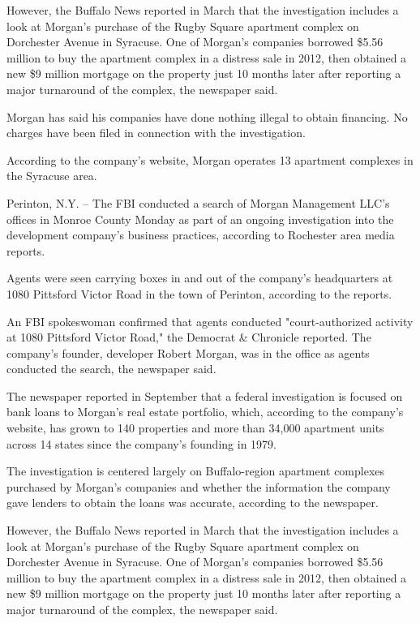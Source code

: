 \documentclass[../../main/main.tex]{subfiles}
\begin{document}
However, the Buffalo News reported in March that the investigation includes a look at Morgan's purchase of the Rugby Square apartment complex on Dorchester Avenue in Syracuse.  One of Morgan's companies borrowed \$5.56 million to buy the apartment complex in a distress sale in 2012, then obtained a new \$9 million mortgage on the property just 10 months later after reporting a major turnaround of the complex, the newspaper said.

Morgan has said his companies have done nothing illegal to obtain financing. No charges have been filed in connection with the investigation. 

According to the company's website, Morgan operates 13 apartment complexes in the Syracuse area.

Perinton, N.Y. -- The FBI conducted a search of Morgan Management LLC's offices in Monroe County Monday as part of an ongoing investigation into the development company's business practices, according to Rochester area media reports.

Agents were seen carrying boxes in and out of the company's headquarters at 1080 Pittsford Victor Road in the town of Perinton, according to the reports.

An FBI spokeswoman confirmed that agents conducted "court-authorized activity at 1080 Pittsford Victor Road," the Democrat \& Chronicle reported. The company's founder, developer Robert Morgan, was in the office as agents conducted the search, the newspaper said.

The newspaper reported in September that a federal investigation is focused on bank loans to Morgan's real estate portfolio, which, according to the company's website, has grown to 140 properties and more than 34,000 apartment units across 14 states since the company's founding in 1979.

The investigation is centered largely on Buffalo-region apartment complexes purchased by Morgan's companies and whether the information the company gave lenders to obtain the loans was accurate, according to the newspaper.

However, the Buffalo News reported in March that the investigation includes a look at Morgan's purchase of the Rugby Square apartment complex on Dorchester Avenue in Syracuse.  One of Morgan's companies borrowed \$5.56 million to buy the apartment complex in a distress sale in 2012, then obtained a new \$9 million mortgage on the property just 10 months later after reporting a major turnaround of the complex, the newspaper said.
\end{document}

